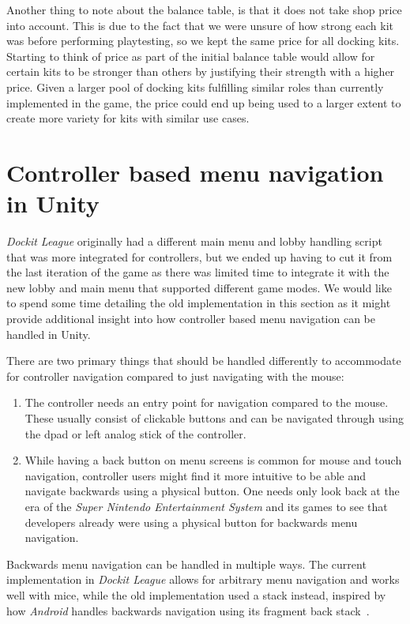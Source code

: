 Another thing to note about the balance table, is that it does not take shop price into account. This is due to the fact that we were unsure of how strong each kit was before performing playtesting, so we kept the same price for all docking kits. Starting to think of price as part of the initial balance table would allow for certain kits to be stronger than others by justifying their strength with a higher price. Given a larger pool of docking kits fulfilling similar roles than currently implemented in the game, the price could end up being used to a larger extent to create more variety for kits with similar use cases. 
 
\section{Controller based menu navigation in Unity}
\emph{Dockit League} originally had a different main menu and lobby handling script that was more integrated for controllers, but we ended up having to cut it from the last iteration of the game as there was limited time to integrate it with the new lobby and main menu that supported different game modes. We would like to spend some time detailing the old implementation in this section as it might provide additional insight into how controller based menu navigation can be handled in Unity. 

There are two primary things that should be handled differently to accommodate for controller navigation compared to just navigating with the mouse:
\begin{enumerate}
    \item The controller needs an entry point for navigation compared to the mouse. These usually consist of clickable buttons and can be navigated through using the dpad or left analog stick of the controller. 
    \item While having a back button on menu screens is common for mouse and touch navigation, controller users might find it more intuitive to be able and navigate backwards using a physical button. One needs only look back at the era of the \emph{Super Nintendo Entertainment System} and its games to see that developers already were using a physical button for backwards menu navigation. 
\end{enumerate}

Backwards menu navigation can be handled in multiple ways. The current implementation in \emph{Dockit League} allows for arbitrary menu navigation and works well with mice, while the old implementation used a stack instead, inspired by how \emph{Android} handles backwards navigation using its fragment back stack~\cite{androidBackStack}. 


